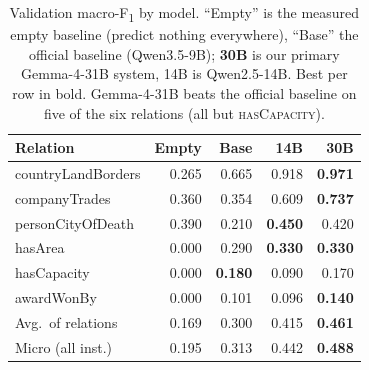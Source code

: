 \begin{table}[t]
\centering\footnotesize
\setlength{\tabcolsep}{3.5pt}
\begin{tabular}{lrrrr}
\toprule
Relation & Empty & Base & 14B & \textbf{30B} \\
\midrule
countryLandBorders  & 0.265 & 0.665 & 0.918 & \textbf{0.971} \\
companyTrades       & 0.360 & 0.354 & 0.609 & \textbf{0.737} \\
personCityOfDeath   & 0.390 & 0.210 & \textbf{0.450} & 0.420 \\
hasArea             & 0.000 & 0.290 & \textbf{0.330} & \textbf{0.330} \\
hasCapacity         & 0.000 & \textbf{0.180} & 0.090 & 0.170 \\
awardWonBy          & 0.000 & 0.101 & 0.096 & \textbf{0.140} \\
\midrule
Avg.\ of relations  & 0.169 & 0.300 & 0.415 & \textbf{0.461} \\
Micro (all inst.)   & 0.195 & 0.313 & 0.442 & \textbf{0.488} \\
\bottomrule
\end{tabular}
\caption{Validation macro-F\textsubscript{1} by model. ``Empty'' is the measured
empty baseline (predict nothing everywhere), ``Base'' the official baseline
(Qwen3.5-9B); \textbf{30B} is our primary Gemma-4-31B system, 14B is Qwen2.5-14B.
Best per row in bold. Gemma-4-31B beats the official baseline on five of the six
relations (all but \textsc{hasCapacity}).}
\label{tab:results}
\end{table}
